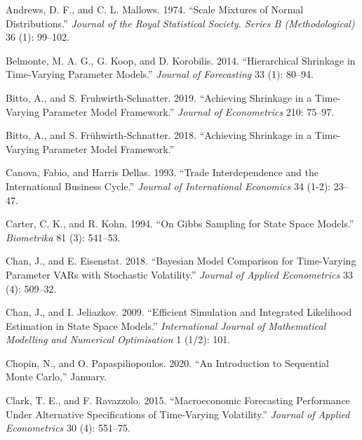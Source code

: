 \documentclass[
  12pt,
]{book}
\newlength{\cslhangindent}
\newlength{\cslentryspacingunit} %
\newenvironment{CSLReferences}[2] %
 {%
  \setlength{\parindent}{0pt}
  \ifodd #1
  \let\oldpar\par
  \def\par{\hangindent=\cslhangindent\oldpar}
  \fi
  \setlength{\parskip}{#2\cslentryspacingunit}
 }%
 {}
\theoremstyle{break}
\theoremstyle{nonumberplain}
\begin{document}
\begin{CSLReferences}{1}{0}
\leavevmode{}%
Andrews, D. F., and C. L. Mallows. 1974. {``Scale Mixtures of Normal
Distributions.''} \emph{Journal of the Royal Statistical Society. Series
B (Methodological)} 36 (1): 99--102.

\leavevmode{}%
Belmonte, M. A. G., G. Koop, and D. Korobilis. 2014. {``{Hierarchical
Shrinkage in Time‐Varying Parameter Models}.''} \emph{Journal of
Forecasting} 33 (1): 80--94.

\leavevmode{}%
Bitto, A., and S. Fruhwirth-Schnatter. 2019. {``Achieving Shrinkage in a
Time-Varying Parameter Model Framework.''} \emph{Journal of
Econometrics} 210: 75--97.

\leavevmode{}%
Bitto, A., and S. Frühwirth-Schnatter. 2018. {``Achieving Shrinkage in a
Time-Varying Parameter Model Framework.''}

\leavevmode{}%
Canova, Fabio, and Harris Dellas. 1993. {``Trade Interdependence and the
International Business Cycle.''} \emph{Journal of International
Economics} 34 (1-2): 23--47.

\leavevmode{}%
Carter, C. K., and R. Kohn. 1994. {``On Gibbs Sampling for State Space
Models.''} \emph{Biometrika} 81 (3): 541--53.

\leavevmode{}%
Chan, J., and E. Eisenstat. 2018. {``Bayesian Model Comparison for
Time-Varying Parameter VARs with Stochastic Volatility.''} \emph{Journal
of Applied Econometrics} 33 (4): 509--32.

\leavevmode{}%
Chan, J., and I. Jeliazkov. 2009. {``Efficient Simulation and Integrated
Likelihood Estimation in State Space Models.''} \emph{International
Journal of Mathematical Modelling and Numerical Optimisation} 1 (1/2):
101.

\leavevmode{}%
Chopin, N., and O. Papaspiliopoulos. 2020. {``An Introduction to
Sequential Monte Carlo,''} January.

\leavevmode{}%
Clark, T. E., and F. Ravazzolo. 2015. {``Macroeconomic Forecasting
Performance Under Alternative Specifications of Time-Varying
Volatility.''} \emph{Journal of Applied Econometrics} 30 (4): 551--75.


\end{CSLReferences}
\end{document}
